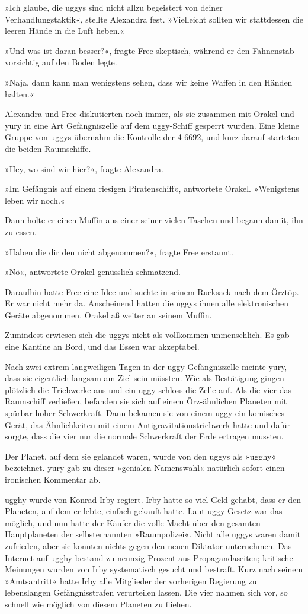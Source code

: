 »Ich glaube, die uggys sind nicht allzu begeistert von deiner Verhandlungstaktik«, stellte Alexandra fest. »Vielleicht sollten wir stattdessen die leeren Hände in die Luft heben.«

»Und was ist daran besser?«, fragte Free skeptisch, während er den Fahnenstab vorsichtig auf den Boden legte.

»Naja, dann kann man wenigstens sehen, dass wir keine Waffen in den Händen halten.«

Alexandra und Free diskutierten noch immer, als sie zusammen mit Orakel und yury in eine Art Gefängniszelle auf dem uggy-Schiff gesperrt wurden. Eine kleine Gruppe von uggys übernahm die Kontrolle der 4-6692, und kurz darauf starteten die beiden Raumschiffe.

»Hey, wo sind wir hier?«, fragte Alexandra.

»Im Gefängnis auf einem riesigen Piratenschiff«, antwortete Orakel. »Wenigstens leben wir noch.«

Dann holte er einen Muffin aus einer seiner vielen Taschen und begann damit, ihn zu essen.

»Haben die dir den nicht abgenommen?«, fragte Free erstaunt.

»Nö«, antwortete Orakel genüsslich schmatzend.

Daraufhin hatte Free eine Idee und suchte in seinem Rucksack nach dem Örztöp. Er war nicht mehr da. Anscheinend hatten die uggys ihnen alle elektronischen Geräte abgenommen. Orakel aß weiter an seinem Muffin.

Zumindest erwiesen sich die uggys nicht als vollkommen unmenschlich. Es gab eine Kantine an Bord, und das Essen war akzeptabel.

Nach zwei extrem langweiligen Tagen in der uggy-Gefängniszelle meinte yury, dass sie eigentlich langsam am Ziel sein müssten. Wie als Bestätigung gingen plötzlich die Triebwerke aus und ein uggy schloss die Zelle auf. Als die vier das Raumschiff verließen, befanden sie sich auf einem Örz-ähnlichen Planeten mit spürbar hoher Schwerkraft. Dann bekamen sie von einem uggy ein komisches Gerät, das Ähnlichkeiten mit einem Antigravitationstriebwerk hatte und dafür sorgte, dass die vier nur die normale Schwerkraft der Erde ertragen mussten.

Der Planet, auf dem sie gelandet waren, wurde von den uggys als »ugghy« bezeichnet. yury gab zu dieser »genialen Namenswahl« natürlich sofort einen ironischen Kommentar ab.

ugghy wurde von Konrad Irby regiert. Irby hatte so viel Geld gehabt, dass er den Planeten, auf dem er lebte, einfach gekauft hatte. Laut uggy-Gesetz war das möglich, und nun hatte der Käufer die volle Macht über den gesamten Hauptplaneten der selbsternannten »Raumpolizei«. Nicht alle uggys waren damit zufrieden, aber sie konnten nichts gegen den neuen Diktator unternehmen. Das Internet auf ugghy bestand zu neunzig Prozent aus Propagandaseiten; kritische Meinungen wurden von Irby systematisch gesucht und bestraft. Kurz nach seinem »Amtsantritt« hatte Irby alle Mitglieder der vorherigen Regierung zu lebenslangen Gefängnisstrafen verurteilen lassen. Die vier nahmen sich vor, so schnell wie möglich von diesem Planeten zu fliehen.

